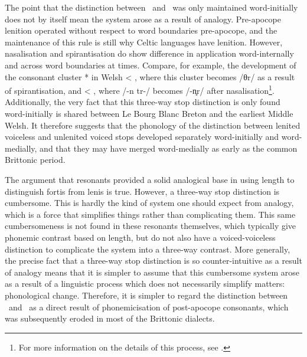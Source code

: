 The point that the distinction between \lT\ and \xD\ was only maintained word-initially does not by itself mean the system arose as a result of analogy. Pre-apocope lenition operated without respect to word boundaries pre-apocope, and the maintenance of this rule is still why Celtic languages have lenition. However, nasalisation and spirantisation do show difference in application word-internally and across word boundaries at times. Compare, for example, the development of the consonant cluster * in Welsh  < , where this cluster becomes /θr/ as a result of spirantisation, and  < , where /-n tr-/ becomes /-n̥r/ after nasalisation\footnote{For more information on the details of this process, see \textcite{schrijver_spirantization_1999,isaac_chronology_2004}.}. Additionally, the very fact that this three-way stop distinction is only found word-initially is shared between Le Bourg Blanc Breton and the earliest Middle Welsh. It therefore suggests that the phonology of the distinction between lenited voiceless and unlenited voiced stops developed separately word-initially and word-medially, and that they may have merged word-medially as early as the common Brittonic period.
 
 
The argument that resonants provided a solid analogical base in using length to distinguish fortis from lenis is true. However, a three-way stop distinction is cumbersome. This is hardly the kind of system one should expect from analogy, which is a force that simplifies things rather than complicating them. This same cumbersomeness is not found in these resonants themselves, which typically give phonemic contrast based on length, but do not also have a voiced-voiceless distinction to complicate the system into a three-way contrast. More generally, the precise fact that a three-way stop distinction is so counter-intuitive as a result of analogy means that it is simpler to assume that this cumbersome system arose as a result of a linguistic process which does not necessarily simplify matters: phonological change. Therefore, it is simpler to regard the distinction between \lT\ and \xD\ as a direct result of phonemicisation of post-apocope consonants, which was subsequently eroded in most of the Brittonic dialects.  


